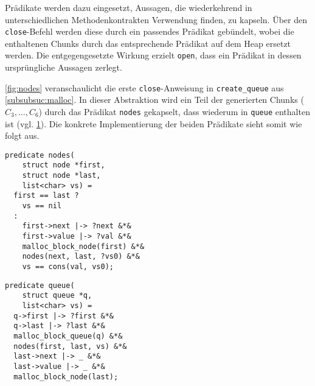 Prädikate werden dazu eingesetzt, Aussagen, die wiederkehrend in unterschiedlichen Methodenkontrakten Verwendung finden, zu kapseln. Über den \texttt{close}-Befehl werden diese durch ein passendes Prädikat gebündelt, wobei die enthaltenen Chunks durch das entsprechende Prädikat auf dem Heap ersetzt werden. Die entgegengesetzte Wirkung erzielt \texttt{open}, dass ein Prädikat in dessen ursprüngliche Aussagen zerlegt. \cite{Jacobs2008,Jacobs2017}

\begin{figure}[hbt!]
	\begin{minipage}{.45\textwidth}
		
		\label{fig:nodes}
	\end{minipage}
	\hfill
	\begin{minipage}{.45\textwidth}
		
		\label{fig:queue}
	\end{minipage}
\end{figure}

\noindent
\cref{fig:nodes} veranschaulicht die erste \texttt{close}-Anweisung in \texttt{create\_queue} aus \cref{subsubsuc:malloc}. In dieser Abstraktion wird ein Teil der generierten Chunks ($C_{3},\ldots,C_{6}$) durch das Prädikat \texttt{nodes} gekapselt, dass wiederum in \texttt{queue} enthalten ist (vgl. \cref{fig:queue}). Die konkrete Implementierung der beiden Prädikate sieht somit wie folgt aus.

\vspace{-10pt}
{\noindent
\begin{minipage}[t]{.45\textwidth}
\begin{lstlisting}
predicate nodes(
    struct node *first,
    struct node *last,
    list<char> vs) =
  first == last ?
    vs == nil
  :
    first->next |-> ?next &*&
    first->value |-> ?val &*&
    malloc_block_node(first) &*&
    nodes(next, last, ?vs0) &*&
    vs == cons(val, vs0);
\end{lstlisting}
\end{minipage}
\hfill
\begin{minipage}[t]{.45\textwidth}
\begin{lstlisting}
predicate queue(
    struct queue *q,
    list<char> vs) =
  q->first |-> ?first &*&
  q->last |-> ?last &*&
  malloc_block_queue(q) &*&
  nodes(first, last, vs) &*&
  last->next |-> _ &*&
  last->value |-> _ &*&
  malloc_block_node(last);
\end{lstlisting}
\end{minipage}
}

